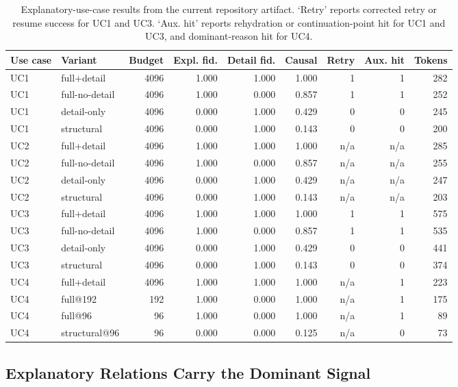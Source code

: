 \documentclass[11pt]{article}
\begin{document}
\begin{table}[t]
\centering
\small
\begin{tabular}{llrrrrrrr}
\toprule
Use case & Variant & Budget & Expl. fid. & Detail fid. & Causal & Retry & Aux. hit & Tokens \\
\midrule
UC1 & full+detail & 4096 & 1.000 & 1.000 & 1.000 & 1 & 1 & 282 \\
UC1 & full-no-detail & 4096 & 1.000 & 0.000 & 0.857 & 1 & 1 & 252 \\
UC1 & detail-only & 4096 & 0.000 & 1.000 & 0.429 & 0 & 0 & 245 \\
UC1 & structural & 4096 & 0.000 & 1.000 & 0.143 & 0 & 0 & 200 \\
UC2 & full+detail & 4096 & 1.000 & 1.000 & 1.000 & n/a & n/a & 285 \\
UC2 & full-no-detail & 4096 & 1.000 & 0.000 & 0.857 & n/a & n/a & 255 \\
UC2 & detail-only & 4096 & 0.000 & 1.000 & 0.429 & n/a & n/a & 247 \\
UC2 & structural & 4096 & 0.000 & 1.000 & 0.143 & n/a & n/a & 203 \\
UC3 & full+detail & 4096 & 1.000 & 1.000 & 1.000 & 1 & 1 & 575 \\
UC3 & full-no-detail & 4096 & 1.000 & 0.000 & 0.857 & 1 & 1 & 535 \\
UC3 & detail-only & 4096 & 0.000 & 1.000 & 0.429 & 0 & 0 & 441 \\
UC3 & structural & 4096 & 0.000 & 1.000 & 0.143 & 0 & 0 & 374 \\
UC4 & full+detail & 4096 & 1.000 & 1.000 & 1.000 & n/a & 1 & 223 \\
UC4 & full@192 & 192 & 1.000 & 0.000 & 1.000 & n/a & 1 & 175 \\
UC4 & full@96 & 96 & 1.000 & 0.000 & 1.000 & n/a & 1 & 89 \\
UC4 & structural@96 & 96 & 0.000 & 0.000 & 0.125 & n/a & 0 & 73 \\
\bottomrule
\end{tabular}
\caption{Explanatory-use-case results from the current repository artifact.
`Retry' reports corrected retry or resume success for UC1 and UC3. `Aux. hit'
reports rehydration or continuation-point hit for UC1 and UC3, and
dominant-reason hit for UC4.}
\label{tab:main-results}
\end{table}

\subsection{Explanatory Relations Carry the Dominant Signal}
\end{document}
